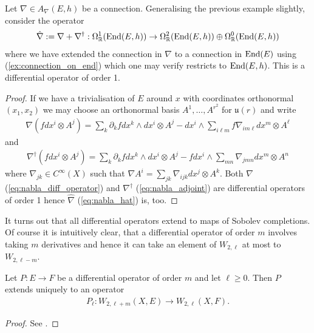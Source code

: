 \documentclass[12pt]{ociamthesis}  %
\begin{document}
\begin{example}
  Let $\nabla\in A_\nabla(E,h)$ be a connection. Generalising the previous
  example slightly, consider the operator
  \begin{align}\label{eq:nabla_hat}
    \hat\nabla := \nabla + \nabla^\dagger :
    \Omega^1_{\mathbb R}(\operatorname{End}(E,h)) \to
    \Omega^2_{\mathbb R}(\operatorname{End}(E,h)) \oplus
    \Omega^0_{\mathbb R}(\operatorname{End}(E,h))
  \end{align}
  where we have extended the connection in $\nabla$ to a connection
  in $\operatorname{End}(E)$ using (\ref{ex:connection_on_end}) which
  one may verify restricts to $\operatorname{End}(E,h)$. This is a
  differential operator of order 1.
  \begin{proof}
    If we have a trivialisation of $E$ around $x$ with coordinates orthonormal
    $(x_1,x_2)$ we may choose an orthonormal basis $A^1,\ldots,A^{r^2}$ for
    $\mathfrak u(r)$ and write
    \begin{align}\label{eq:nabla_diff_operator}
      \nabla\left(fdx^i\otimes A^j\right)
      = \sum_k \partial_k f dx^k\wedge dx^i \otimes A^j
      - dx^i\wedge\sum_{i\ell m} f\nabla_{im\ell}dx^m\otimes A^\ell
    \end{align}
    and
    \begin{align}\label{eq:nabla_adjoint}
      \nabla^\dagger\left(fdx^i \otimes A^j\right)
      = \sum_k \partial_k fdx^k\wedge dx^i\otimes A^j
      - fdx^i \wedge \sum_{mn} \nabla_{jmn}dx^m\otimes A^n
    \end{align}
    where $\nabla_{jk}\in C^\infty(X)$ such that
    $\nabla A^i = \sum_{jk}\nabla_{ijk}dx^j\otimes A^k$. Both
    $\nabla$ (\ref{eq:nabla_diff_operator}) and $\nabla^\dagger$
    (\ref{eq:nabla_adjoint}) are differential operators of order 1 hence
    $\hat\nabla$ (\ref{eq:nabla_hat}) is, too.
  \end{proof}
\end{example}

It turns out that all differential operators extend to maps of Sobolev
completions. Of course it is intuitively clear, that a differential
operator of order $m$ involves taking $m$ derivatives and hence
it can take an element of $W_{2,\ell}$ at most to $W_{2,\ell-m}$.

\begin{theorem}
  Let $P:E\to F$ be a differential operator of order $m$ and
  let $\ell \geq 0$. Then $P$ extends uniquely to an operator
  \begin{align*}
    P_\ell : W_{2,\ell+m}(X,E) \to W_{2,\ell}(X,F).
  \end{align*}
  \begin{proof}
    See \cite[{Proposition 3.8.4}]{bc2009}.
  \end{proof}
\end{theorem}
\end{document}
